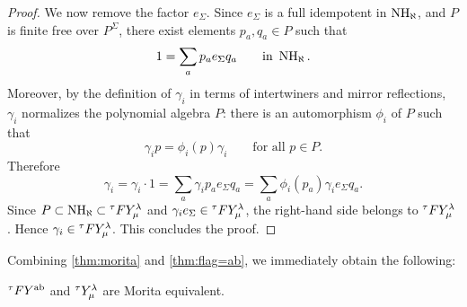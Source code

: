 \begin{proof}
We now remove the factor $e_\Sigma$. Since $e_\Sigma$ is a full idempotent in
$\operatorname{NH}_\aleph$, and $P$ is finite free over $P^\Sigma$, there exist elements
$p_a,q_a\in P$ such that
\[
    1=\sum_a p_a e_\Sigma q_a
    \qquad \text{in } \operatorname{NH}_\aleph .
\]
Moreover, by the definition of $\gamma_i$ in terms of intertwiners and mirror
reflections, $\gamma_i$ normalizes the polynomial algebra $P$: there is an
automorphism $\phi_i$ of $P$ such that
\[
    \gamma_i p=\phi_i(p)\gamma_i
    \qquad \text{for all }p\in P .
\]
Therefore
\[
    \gamma_i
    =
    \gamma_i\cdot 1
    =
    \sum_a \gamma_i p_a e_\Sigma q_a
    =
    \sum_a \phi_i(p_a)\gamma_i e_\Sigma q_a .
\]
Since $P\subset \operatorname{NH}_\aleph\subset {}^\tau F Y_\mu^\lambda$ and $\gamma_i e_\Sigma\in {}^\tau F Y_\mu^\lambda$, the
right-hand side belongs to ${}^\tau F Y_\mu^\lambda$. Hence $\gamma_i\in{}^\tau F Y_\mu^\lambda$. This concludes the proof.
\end{proof}

Combining \cref{thm:morita} and \cref{thm:flag=ab}, we immediately obtain the following:
\begin{corollary}
    ${}^\tau F Y^{\text{ab}}$ and ${}^\tau Y_\mu^\lambda$ are Morita equivalent.
\end{corollary}



